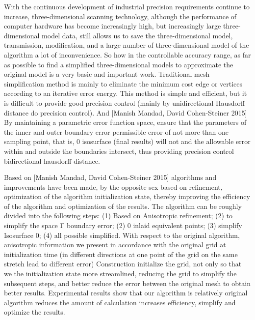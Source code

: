 

\begin{eabstract}
  With the continuous development of industrial precision requirements continue to increase, three-dimensional scanning technology, although the performance of computer hardware has become increasingly high, but increasingly large three-dimensional model data, still allows us to save the three-dimensional model, transmission, modification, and a large number of three-dimensional model of the algorithm a lot of inconvenience. So how in the controllable accuracy range, as far as possible to find a simplified three-dimensional models to approximate the original model is a very basic and important work. Traditional mesh simplification method is mainly to eliminate the minimum cost edge or vertices according to an iterative error energy. This method is simple and efficient, but it is difficult to provide good precision control (mainly by unidirectional Hausdorff distance do precision control). And [Manish Mandad, David Cohen-Steiner 2015] By maintaining a parametric error function space, ensure that the parameters of the inner and outer boundary error permissible error of not more than one sampling point, that is, 0 isosurface (final results) will not and the allowable error within and outside the boundaries intersect, thus providing precision control bidirectional hausdorff distance.\par
Based on [Manish Mandad, David Cohen-Steiner 2015] algorithms and improvements have been made, by the opposite sex based on refinement, optimization of the algorithm initialization state, thereby improving the efficiency of the algorithm and optimization of the results. The algorithm can be roughly divided into the following steps: (1) Based on Anisotropic refinement; (2) to simplify the space Γ boundary error; (2) 0 inlaid equivalent points; (3) simplify Isosurface 0; (4) all possible simplified. With respect to the original algorithm, anisotropic information we present in accordance with the original grid at initialization time (in different directions at one point of the grid on the same stretch lead to different error) Construction initialize the grid, not only so that we the initialization state more streamlined, reducing the grid to simplify the subsequent steps, and better reduce the error between the original mesh to obtain better results.
Experimental results show that our algorithm is relatively original algorithm reduces the amount of calculation increases efficiency, simplify and optimize the results.
\end{eabstract}

